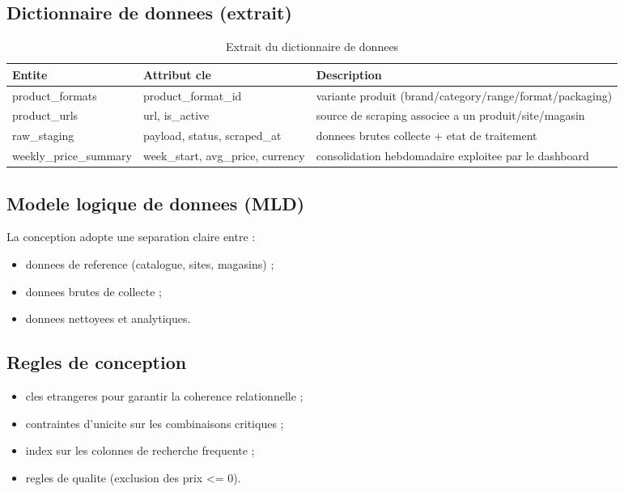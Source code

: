 \subsection{Dictionnaire de donnees (extrait)}
\begin{table}[H]
\centering
\caption{Extrait du dictionnaire de donnees}
\begin{tabular}{p{3.5cm}p{4.0cm}p{5.9cm}}
\toprule
\textbf{Entite} & \textbf{Attribut cle} & \textbf{Description} \\
\midrule
product\_formats & product\_format\_id & variante produit (brand/category/range/format/packaging) \\
product\_urls & url, is\_active & source de scraping associee a un produit/site/magasin \\
raw\_staging & payload, status, scraped\_at & donnees brutes collecte + etat de traitement \\
weekly\_price\_summary & week\_start, avg\_price, currency & consolidation hebdomadaire exploitee par le dashboard \\
\bottomrule
\end{tabular}
\end{table}

\subsection{Modele logique de donnees (MLD)}
La conception adopte une separation claire entre :
\begin{itemize}[leftmargin=1.2cm]
	\item donnees de reference (catalogue, sites, magasins) ;
	\item donnees brutes de collecte ;
	\item donnees nettoyees et analytiques.
\end{itemize}


\subsection{Regles de conception}
\begin{itemize}[leftmargin=1.2cm]
	\item cles etrangeres pour garantir la coherence relationnelle ;
	\item contraintes d'unicite sur les combinaisons critiques ;
	\item index sur les colonnes de recherche frequente ;
	\item regles de qualite (exclusion des prix <= 0).
\end{itemize}

